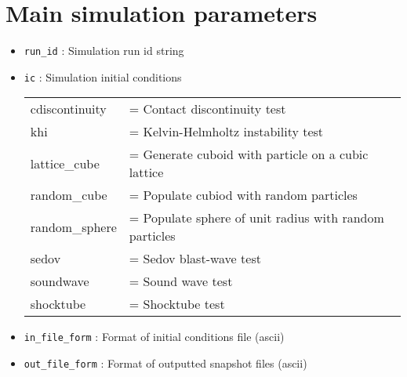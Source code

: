 \documentclass[a4paper]{article}
\newcommand{\var}[1]{\texttt{#1}}
\begin{document}
\section{Main simulation parameters}


\begin{itemize}

\item \var{run\_id}  : Simulation run id string

\item \var{ic} : Simulation initial conditions \vspace{0.1cm} \\
\begin{tabular}{ll}
cdiscontinuity   & = Contact discontinuity test \\
khi              & = Kelvin-Helmholtz instability test \\
lattice\_cube    & = Generate cuboid with particle on a cubic lattice \\
random\_cube     & = Populate cubiod with random particles \\
random\_sphere   & = Populate sphere of unit radius with random particles \\
sedov            & = Sedov blast-wave test \\
soundwave        & = Sound wave test \\
shocktube        & = Shocktube test
\end{tabular}




\item \var{in\_file\_form} : Format of initial conditions file
                      (ascii)

\item \var{out\_file\_form} : Format of outputted snapshot files
                      (ascii)





\end{itemize}
\end{document}
